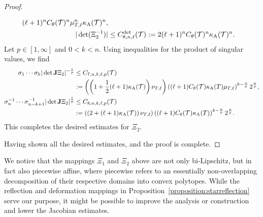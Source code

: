 \documentclass[10pt,a4paper]{article}
\begin{document}
\begin{proof}
\begin{itemize}
\begin{align*}
            (\ell+1)^{n}
            C_\theta({\mathcal T})^{n}
            \mu_{T,\ell}^{n}
            \kappa_{\rm A}({\mathcal T})^{n}
            ,
            \\
            |\det(\Xi_{2}^{-1})|
            &\leq 
            C^{\det}_{8,n,\ell}({\mathcal T})
            :=
            2
            (\ell+1)^{n}
            C_\theta({\mathcal T})^{n}
            \kappa_{\rm A}({\mathcal T})^{n}
            .
        \end{align*}
        \color{blue}
        Let $p \in [1,\infty]$ and $0 < k < n$. Using inequalities for the product of singular values, we find 
        \begin{align*}
            \sigma_{1}\cdots\sigma_{k} | \det{\mathbf{J}}\Xi_{2} |^{-\frac 1 p}
            &
            \leq 
            C_{7,n,k,\ell,p}({\mathcal T})
            \\&
            :=
            \left( 
            \left( 1 + \frac 1 2 ( \ell+1 )\kappa_{\rm A}({\mathcal T}) \right)
            \nu_{T,\ell}
            \right)
            \left( (\ell+1) C_\theta({\mathcal T}) \kappa_{\rm A}(T)\mu_{T,\ell} \right)^{k-\frac n p} 2^{\frac n p}
            ,
            \\
            \sigma_{n}^{-1}\cdots\sigma_{n-k+1}^{-1} | \det{\mathbf{J}}\Xi_{2} |^{\frac 1 p}
            &
            \leq 
            C_{8,n,k,\ell,p}({\mathcal T})
            \\&
            :=
            \left(
            \left( 2 + ( \ell+1 )\kappa_{\rm A}({\mathcal T}) \right)
            \nu_{T,\ell}
            \right)
            \left( (\ell+1) C_\theta({\mathcal T}) \kappa_{\rm A}(T) \right)^{k-\frac n p} 2^{\frac n p}            
            .
        \end{align*}
        \color{black}
        This completes the desired estimates for $\Xi_{2}$. 
    \end{itemize}
    Having shown all the desired estimates, and the proof is complete. 
\end{proof}
        

\begin{remark}
    We notice that the mappings $\Xi_{1}$ and $\Xi_{2}$ above are not only bi-Lipschitz, but in fact also piecewise affine, 
    where piecewise refers to an essentially non-overlapping decomposition of their respective domains into convex polytopes.
    While the reflection and deformation mappings in Proposition~\ref{proposition:starreflection} serve our purpose,
    it might be possible to improve the analysis or construction and lower the Jacobian estimates. 
\end{remark}
\end{document}
